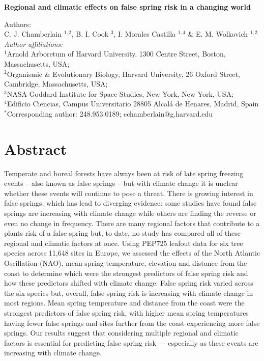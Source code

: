 \documentclass{article}\usepackage[]{graphicx}\usepackage[]{color}
\begin{document}
\noindent \textbf{\Large{Regional and climatic effects on false spring risk in a changing world}}

\noindent Authors:\\
C. J. Chamberlain $^{1,2}$, B. I. Cook $^{3}$, I. Morales Castilla $^{1,4}$ \& E. M. Wolkovich $^{1,2}$
\vspace{2ex}\\
\emph{Author affiliations:}\\
$^{1}$Arnold Arboretum of Harvard University, 1300 Centre Street, Boston, Massachusetts, USA; \\
$^{2}$Organismic \& Evolutionary Biology, Harvard University, 26 Oxford Street, Cambridge, Massachusetts, USA; \\
$^{3}$NASA Goddard Institute for Space Studies, New York, New York, USA; \\
$^{4}$Edificio Ciencias, Campus Universitario 28805 Alcalá de Henares, Madrid, Spain \\
\vspace{2ex}
$^*$Corresponding author: 248.953.0189; cchamberlain@g.harvard.edu\\

\renewcommand{\thetable}{\arabic{table}}
\renewcommand{\thefigure}{\arabic{figure}}
\renewcommand{\labelitemi}{$-$}


\section*{Abstract}
Temperate and boreal forests have always been at risk of late spring freezing events -- also known as false springs -- but with climate change it is unclear whether these events will continue to pose a threat. There is growing interest in false springs, which has lead to diverging evidence: some studies have found false springs are increasing with climate change while others are finding the reverse or even no change in frequency. There are many regional factors that contribute to a plants risk of a false spring but, to date, no study has compared all of these regional and climatic factors at once. Using PEP725 leafout data for six tree species across 11,648 sites in Europe, we assessed the effects of the North Atlantic Oscillation (NAO), mean spring temperature, elevation and distance from the coast to determine which were the strongest predictors of false spring risk and how these predictors shifted with climate change. False spring risk varied across the six species but, overall, false spring risk is increasing with climate change in most regions. Mean spring temperature and distance from the coast were the strongest predictors of false spring risk, with higher mean spring temperatures having fewer false springs and sites further from the coast experiencing more false springs. Our results suggest that considering multiple regional and climatic factors is essential for predicting false spring risk --- especially as these events are increasing with climate change.
\end{document}
